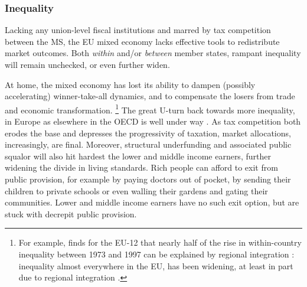 \subsubsection{Inequality} Lacking any union-level fiscal institutions and marred by tax competition between the \gls{MS}, the \gls{EU} mixed economy lacks effective tools to redistribute market outcomes.
Both \emph{within} and/or \emph{between} member states, rampant inequality will remain unchecked, or even further widen.

At home, the mixed economy has lost its ability to dampen (possibly accelerating) winner-take-all dynamics, and to compensate the losers from trade and economic transformation.
\footnote{
	For example, \citeauthor{Beckfield2006} finds for the \gls{EU}-12 that nearly half of the rise in within-country inequality between 1973 and 1997 can be explained by regional integration \citeyearpar[979]{Beckfield2006}:
	inequality almost everywhere in the \gls{EU}, has been widening, at least in part due to regional integration \citep[for example,][265]{DaudUngl200}.
}
The great U-turn back towards more inequality, in Europe as elsewhere in the \gls{OECD} is well under way \citep{AldersonNielsen-2002-aa}.
As tax competition both erodes the base and depresses the progressivity of taxation, market allocations, increasingly, are final.
Moreover, structural underfunding and associated public squalor will also hit hardest the lower and middle income earners, further widening the divide in living standards.
Rich people can afford to exit from public provision, for example by paying doctors out of pocket, by sending their children to private schools or even walling their gardens and gating their communities.
Lower and middle income earners have no such exit option, but are stuck with decrepit public provision.

